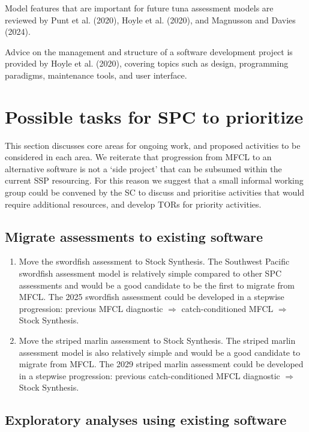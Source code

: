 \documentclass{SCreport}
\begin{document}
Model features that are important for future tuna assessment models are reviewed
by Punt et al. (2020), Hoyle et al. (2020), and Magnusson and Davies (2024).

Advice on the management and structure of a software development project is
provided by Hoyle et al. (2020), covering topics such as design, programming
paradigms, maintenance tools, and user interface.

\section{Possible tasks for SPC to prioritize}
\label{sec:possible-tasks}

This section discusses core areas for ongoing work, and proposed activities to
be considered in each area. We reiterate that progression from MFCL to an
alternative software is not a `side project' that can be subsumed within the
current SSP resourcing. For this reason we suggest that a small informal working
group could be convened by the SC to discuss and prioritise activities that
would require additional resources, and develop TORs for priority activities.

\subsection{Migrate assessments to existing software}

\begin{enumerate}
  \item Move the swordfish assessment to Stock Synthesis. The Southwest Pacific
  swordfish assessment model is relatively simple compared to other SPC
  assessments and would be a good candidate to be the first to migrate from
  MFCL. The 2025 swordfish assessment could be developed in a stepwise
  progression: previous MFCL diagnostic $\Rightarrow$ catch-conditioned MFCL
  $\Rightarrow$ Stock Synthesis.
  \item Move the striped marlin assessment to Stock Synthesis. The striped
  marlin assessment model is also relatively simple and would be a good
  candidate to migrate from MFCL. The 2029 striped marlin assessment could be
  developed in a stepwise progression: previous catch-conditioned MFCL
  diagnostic $\Rightarrow$ Stock Synthesis.
\end{enumerate}

\subsection{Exploratory analyses using existing software}
\end{document}
